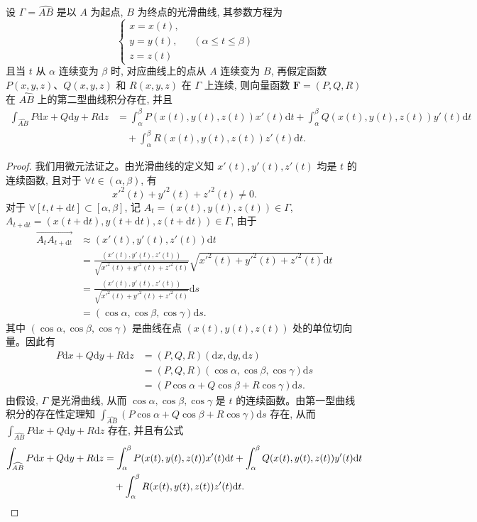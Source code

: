 \begin{theorem}\label{theorem:ma-16-2-1}
设 $\Gamma=\widehat{AB}$ 是以 $A$ 为起点, $B$ 为终点的光滑曲线, 其参数方程为
\[
  \begin{cases}
    x=x(t),\\
    y=y(t),\\
    z=z(t)
  \end{cases}
  \quad(\alpha\leqslant t\leqslant \beta)
\]
且当 $t$ 从 $\alpha$ 连续变为 $\beta$ 时, 对应曲线上的点从 $A$ 连续变为 $B$, 再假定函数 $P(x,y,z)$、$Q(x,y,z)$ 和 $R(x,y,z)$ 在 $\Gamma$ 上连续, 则向量函数 $\boldsymbol F=(P,Q,R)$ 在 $\widehat{AB}$ 上的第二型曲线积分存在, 并且
\[
\begin{aligned}
  \int_{\widehat{AB}}P\mathrm dx+Q\mathrm dy+R\mathrm dz
  &=\int_\alpha^\beta P(x(t),y(t),z(t))x'(t)\mathrm dt
    +\int_\alpha^\beta Q(x(t),y(t),z(t))y'(t)\mathrm dt\\
  &\quad+\int_\alpha^\beta R(x(t),y(t),z(t))z'(t)\mathrm dt.
\end{aligned}
\]
\end{theorem}


\begin{proof}
我们用微元法证之。由光滑曲线的定义知 $x'(t),y'(t),z'(t)$ 均是 $t$ 的连续函数, 且对于 $\forall t\in(\alpha,\beta)$, 有
\[
  x'^2(t)+y'^2(t)+z'^2(t)\ne0.
\]
对于 $\forall[t,t+\mathrm dt]\subset[\alpha,\beta]$, 记 $A_t=(x(t),y(t),z(t))\in\Gamma$, $A_{t+\mathrm dt}=(x(t+\mathrm dt),y(t+\mathrm dt),z(t+\mathrm dt))\in\Gamma$, 由于
\[
\begin{aligned}
  \overrightarrow{A_tA_{t+\mathrm dt}}
  &\approx (x'(t),y'(t),z'(t))\mathrm dt\\
  &=\frac{(x'(t),y'(t),z'(t))}
    {\sqrt{x'^2(t)+y'^2(t)+z'^2(t)}}
    \sqrt{x'^2(t)+y'^2(t)+z'^2(t)}\mathrm dt\\
  &=\frac{(x'(t),y'(t),z'(t))}
    {\sqrt{x'^2(t)+y'^2(t)+z'^2(t)}}\mathrm ds\\
  &=(\cos\alpha,\cos\beta,\cos\gamma)\mathrm ds.
\end{aligned}
\]
其中 $(\cos\alpha,\cos\beta,\cos\gamma)$ 是曲线在点 $(x(t),y(t),z(t))$ 处的单位切向量。因此有
\[
\begin{aligned}
  P\mathrm dx+Q\mathrm dy+R\mathrm dz
  &=(P,Q,R)(\mathrm dx,\mathrm dy,\mathrm dz)\\
  &=(P,Q,R)(\cos\alpha,\cos\beta,\cos\gamma)\mathrm ds\\
  &=(P\cos\alpha+Q\cos\beta+R\cos\gamma)\mathrm ds.
\end{aligned}
\]
由假设, $\Gamma$ 是光滑曲线, 从而 $\cos\alpha,\cos\beta,\cos\gamma$ 是 $t$ 的连续函数。由第一型曲线积分的存在性定理知 $\int_{\widehat{AB}}(P\cos\alpha+Q\cos\beta+R\cos\gamma)\mathrm ds$ 存在, 从而 $\int_{\widehat{AB}}P\mathrm dx+Q\mathrm dy+R\mathrm dz$ 存在, 并且有公式
\[
\begin{aligned}
  \int_{\widehat{AB}}P\mathrm dx+Q\mathrm dy+R\mathrm dz
  &=\int_\alpha^\beta P(x(t),y(t),z(t))x'(t)\mathrm dt
    +\int_\alpha^\beta Q(x(t),y(t),z(t))y'(t)\mathrm dt\\
  &\quad+\int_\alpha^\beta R(x(t),y(t),z(t))z'(t)\mathrm dt.
\end{aligned}
\qedhere
\]
\end{proof}


